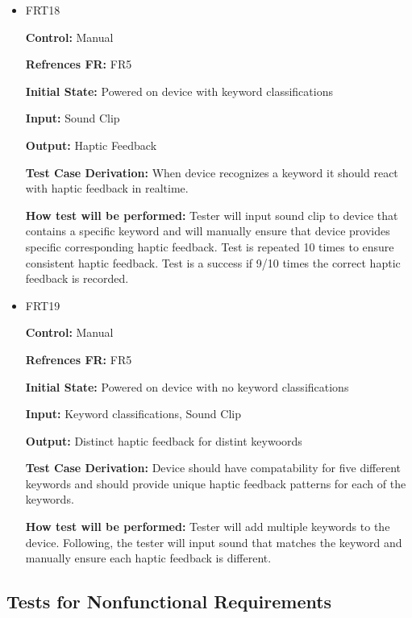\documentclass[12pt, titlepage]{article}
\begin{document}
\begin{itemize}

\item{FRT18}

\textbf{Control:} Manual 

\textbf{Refrences FR:} FR5 					

\textbf{Initial State:} Powered on device with keyword classifications
					
\textbf{Input:} Sound Clip
					
\textbf{Output:} Haptic Feedback

\textbf{Test Case Derivation:} When device recognizes a keyword it should react with haptic feedback in realtime.
					
\textbf{How test will be performed:} Tester will input sound clip to device that contains a specific keyword and will manually ensure that device provides specific corresponding haptic feedback. Test is repeated 10 times to ensure consistent haptic feedback. Test is a success if 9/10 times the correct haptic feedback is recorded.


\item{FRT19}

\textbf{Control:} Manual

\textbf{Refrences FR:} FR5 					

\textbf{Initial State:} Powered on device with no keyword classifications
					
\textbf{Input:} Keyword classifications, Sound Clip
					
\textbf{Output:} Distinct haptic feedback for distint keywoords

\textbf{Test Case Derivation:} Device should have compatability for five different keywords and should provide unique haptic feedback patterns for each of the keywords.
					
\textbf{How test will be performed:} Tester will add multiple keywords to the device. Following, the tester will input sound that matches the keyword and manually ensure each haptic feedback is different.



\end{itemize}

\subsection{Tests for Nonfunctional Requirements}
\end{document}
